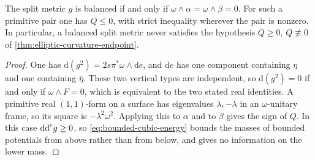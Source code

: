 \begin{proposition}\label{prop:primitive-curvature-opposite-sign}
The split metric $g$ is balanced if and only if $\omega\wedge\alpha=\omega\wedge\beta=0$. For such a primitive pair one has $Q\leq0$, with strict inequality wherever the pair is nonzero. In particular, a balanced split metric never satisfies the hypothesis $Q\geq0$, $Q\not\equiv0$ of \cref{thm:elliptic-curvature-endpoint}.
\end{proposition}
\begin{proof}
One has $\mathrm d(g^2)=2s\pi^*\omega\wedge\mathrm de$, and $\mathrm de$ has one component containing $\eta$ and one containing $\bar\eta$. These two vertical types are independent, so $\mathrm d(g^2)=0$ if and only if $\omega\wedge F=0$, which is equivalent to the two stated real identities. A primitive real $(1,1)$-form on a surface has eigenvalues $\lambda,-\lambda$ in an $\omega$-unitary frame, so its square is $-\lambda^2\omega^2$. Applying this to $\alpha$ and to $\beta$ gives the sign of $Q$. In this case $\mathrm{dd}^{\mathrm{c}} g\geq0$, so \eqref{eq:bounded-cubic-energy} bounds the masses of bounded potentials from above rather than from below, and gives no information on the lower mass.
\end{proof}




